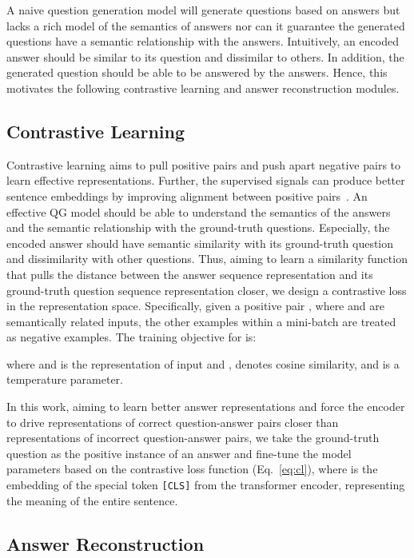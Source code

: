 \documentclass[11pt]{article}
\begin{document}
A naive question generation model will generate questions based on answers but lacks a rich model of the semantics of answers nor can it guarantee the generated questions have a semantic relationship with the answers. Intuitively, an encoded answer should be similar to its question and dissimilar to others. In addition, the generated question should be able to be answered by the answers. Hence, this motivates the following contrastive learning and answer reconstruction modules.

\subsection{Contrastive Learning}
\label{subsec:cl}

Contrastive learning aims to pull positive pairs and push apart negative pairs to learn effective representations. Further, the supervised signals can produce better sentence embeddings by improving alignment between positive pairs~\cite{chen-etal-2020-simple}. An effective QG model should be able to understand the semantics of the answers and the semantic relationship with the ground-truth questions. Especially, the encoded answer should have semantic similarity with its ground-truth question and dissimilarity with other questions. Thus, aiming to learn a similarity function that pulls the distance between the answer sequence representation and its ground-truth question sequence representation closer, we design a contrastive loss in the representation space. Specifically, given a positive pair , where  and  are semantically related inputs, the other  examples within a mini-batch are treated as negative examples. The training objective for  is:

where  and  is the representation of input  and ,  denotes cosine similarity, and  is a temperature parameter.

In this work, aiming to learn better answer representations and force the encoder to drive representations of correct question-answer pairs closer than representations of incorrect question-answer pairs, we take the ground-truth question as the positive instance of an answer and fine-tune the model parameters based on the contrastive loss function (Eq.~\ref{eq:cl}), where  is the embedding of the special token \texttt{[CLS]} from the transformer encoder, representing the meaning of the entire sentence.


\subsection{Answer Reconstruction}
\label{subsec:ar}
\end{document}
